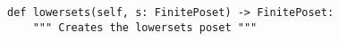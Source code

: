 \begin{verbatim}
def lowersets(self, s: FinitePoset) -> FinitePoset:
    """ Creates the lowersets poset """
\end{verbatim}